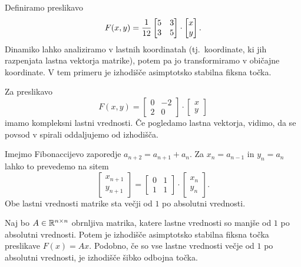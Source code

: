 \begin{primer}
  Definiramo preslikavo
  \[
	F(x,y) = \frac{1}{12}
	\begin{bmatrix}
	  5 & 3 \\
	  3 & 5
	\end{bmatrix}
	\cdot
	\begin{bmatrix}
	  x \\ y
	\end{bmatrix}.
  \]
  Dinamiko lahko analiziramo v lastnih koordinatah (tj.~koordinate, ki jih
  razpenjata lastna vektorja matrike), potem pa jo transformiramo v običajne
  koordinate.
  V tem primeru je izhodišče asimptotsko stabilna fiksna točka.
\end{primer}

\begin{primer}
  Za preslikavo
  \[
	F(x,y) =
	\begin{bmatrix}
	  0 & -2 \\ 2 & 0
	\end{bmatrix}
	\cdot
	\begin{bmatrix}
	  x \\ y
	\end{bmatrix}
  \]
  imamo kompleksni lastni vrednosti.
  Če pogledamo lastna vektorja, vidimo, da se povsod v spirali oddaljujemo od
  izhodišča.
\end{primer}

\begin{primer}
  Imejmo Fibonaccijevo zaporedje $a_{n+2} = a_{n+1} + a_n$.
  Za $x_n = a_{n-1}$ in $y_n = a_n$ lahko to prevedemo na sitem
  \[
	\begin{bmatrix}
	  x_{n+1} \\ y_{n+1}
	\end{bmatrix}
	=
	\begin{bmatrix}
	  0 & 1 \\
	  1 & 1
	\end{bmatrix}
	\cdot
	\begin{bmatrix}
	  x_n \\ y_n
	\end{bmatrix}.
  \]
  Obe lastni vrednosti matrike sta večji od $1$ po absolutni vrednosti.
\end{primer}

\begin{trditev}
  Naj bo $A \in \mathbb{R}^{n \times n}$ obrnljiva matrika, katere lastne vrednosti so
  manjše od $1$ po absolutni vrednosti.
  Potem je izhodišče asimptotsko stabilna fiksna točka preslikave $F(x) = Ax$.
  Podobno, če so vse lastne vrednosti večje od $1$ po absolutni vrednosti, je
  izhodišče šibko odbojna točka.
\end{trditev}

